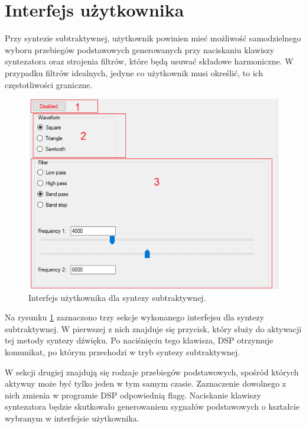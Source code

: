 \section{Interfejs użytkownika}
Przy syntezie subtraktywnej, użytkownik powinien mieć możliwość samodzielnego wyboru przebiegów podstawowych generowanych przy naciskaniu klawiszy syntezatora oraz strojenia filtrów, które będą usuwać składowe harmoniczne. W przypadku filtrów idealnych, jedyne co użytkownik musi określić, to ich częstotliwości graniczne.
\begin{figure}[H]
	\centering
	\includegraphics[width=12cm]{grafiki/sub_interface}
	\captionsetup{justification=centering}
	\caption{Interfejs użytkownika dla syntezy subtraktywnej.}
	\label{rys:sub_interface}
\end{figure}
Na rysunku \ref{rys:sub_interface} zaznaczono trzy sekcje wykonanego interfejsu dla syntezy subtraktywnej. W pierwszej z nich znajduje się przycisk, który służy do aktywacji tej metody syntezy dźwięku. Po naciśnięciu tego klawisza, DSP otrzymuje komunikat, po którym przechodzi w tryb syntezy subtraktywnej.

W sekcji drugiej znajdują się rodzaje przebiegów podstawowych, spośród których aktywny może być tylko jeden w tym samym czasie. Zaznaczenie dowolnego z nich zmienia w programie DSP odpowiednią flagę. Naciskanie klawiszy syntezatora będzie skutkowało generowaniem sygnałów podstawowych o kształcie wybranym w interfejsie użytkownika.

